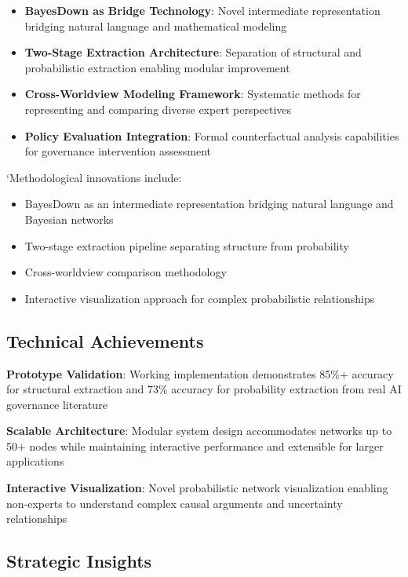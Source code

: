 \documentclass[
  11pt,
  letterpaper,
]{book}
\providecommand{\tightlist}{%
  \setlength{\itemsep}{0pt}\setlength{\parskip}{0pt}}
\begin{document}
\begin{itemize}
\tightlist
\item
  \textbf{BayesDown as Bridge Technology}: Novel intermediate
  representation bridging natural language and mathematical modeling
\item
  \textbf{Two-Stage Extraction Architecture}: Separation of structural
  and probabilistic extraction enabling modular improvement
\item
  \textbf{Cross-Worldview Modeling Framework}: Systematic methods for
  representing and comparing diverse expert perspectives
\item
  \textbf{Policy Evaluation Integration}: Formal counterfactual analysis
  capabilities for governance intervention assessment
\end{itemize}

`Methodological innovations include:

\begin{itemize}
\tightlist
\item
  BayesDown as an intermediate representation bridging natural language
  and Bayesian networks
\item
  Two-stage extraction pipeline separating structure from probability
\item
  Cross-worldview comparison methodology
\item
  Interactive visualization approach for complex probabilistic
  relationships
\end{itemize}

\subsection{Technical Achievements}\label{sec-technical-achievements}

\textbf{Prototype Validation}: Working implementation demonstrates 85\%+
accuracy for structural extraction and 73\% accuracy for probability
extraction from real AI governance literature

\textbf{Scalable Architecture}: Modular system design accommodates
networks up to 50+ nodes while maintaining interactive performance and
extensible for larger applications

\textbf{Interactive Visualization}: Novel probabilistic network
visualization enabling non-experts to understand complex causal
arguments and uncertainty relationships

\subsection{Strategic Insights}\label{sec-strategic-insights}
\end{document}

